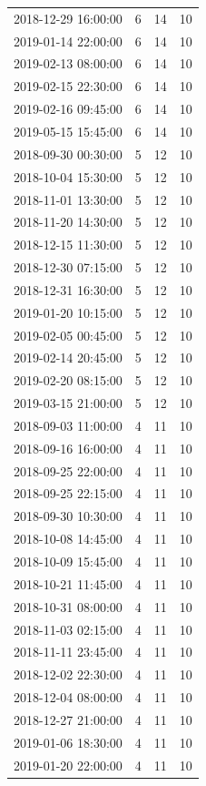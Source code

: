 \begin{tabular}{lrrr}
2018-12-29 16:00:00 & 6 & 14 & 10 \\
2019-01-14 22:00:00 & 6 & 14 & 10 \\
2019-02-13 08:00:00 & 6 & 14 & 10 \\
2019-02-15 22:30:00 & 6 & 14 & 10 \\
2019-02-16 09:45:00 & 6 & 14 & 10 \\
2019-05-15 15:45:00 & 6 & 14 & 10 \\
2018-09-30 00:30:00 & 5 & 12 & 10 \\
2018-10-04 15:30:00 & 5 & 12 & 10 \\
2018-11-01 13:30:00 & 5 & 12 & 10 \\
2018-11-20 14:30:00 & 5 & 12 & 10 \\
2018-12-15 11:30:00 & 5 & 12 & 10 \\
2018-12-30 07:15:00 & 5 & 12 & 10 \\
2018-12-31 16:30:00 & 5 & 12 & 10 \\
2019-01-20 10:15:00 & 5 & 12 & 10 \\
2019-02-05 00:45:00 & 5 & 12 & 10 \\
2019-02-14 20:45:00 & 5 & 12 & 10 \\
2019-02-20 08:15:00 & 5 & 12 & 10 \\
2019-03-15 21:00:00 & 5 & 12 & 10 \\
2018-09-03 11:00:00 & 4 & 11 & 10 \\
2018-09-16 16:00:00 & 4 & 11 & 10 \\
2018-09-25 22:00:00 & 4 & 11 & 10 \\
2018-09-25 22:15:00 & 4 & 11 & 10 \\
2018-09-30 10:30:00 & 4 & 11 & 10 \\
2018-10-08 14:45:00 & 4 & 11 & 10 \\
2018-10-09 15:45:00 & 4 & 11 & 10 \\
2018-10-21 11:45:00 & 4 & 11 & 10 \\
2018-10-31 08:00:00 & 4 & 11 & 10 \\
2018-11-03 02:15:00 & 4 & 11 & 10 \\
2018-11-11 23:45:00 & 4 & 11 & 10 \\
2018-12-02 22:30:00 & 4 & 11 & 10 \\
2018-12-04 08:00:00 & 4 & 11 & 10 \\
2018-12-27 21:00:00 & 4 & 11 & 10 \\
2019-01-06 18:30:00 & 4 & 11 & 10 \\
2019-01-20 22:00:00 & 4 & 11 & 10 \\

\end{tabular}
